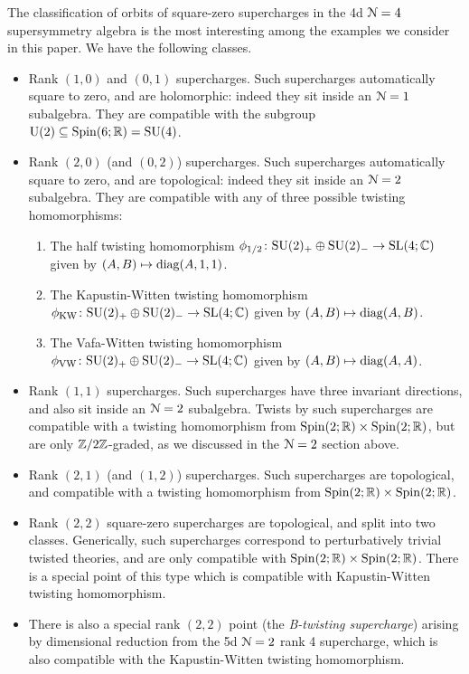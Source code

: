 \documentclass[10pt, oneside]{article}
\renewcommand{\U}{\mathrm{U}}
\begin{document}
The classification of orbits of square-zero supercharges in the 4d $\mathcal{N}=4$ supersymmetry algebra is the most interesting among the examples we consider in this paper.  
We have the following classes. 
\begin{itemize}
\item Rank $(1,0)$ and $(0,1)$ supercharges.  
Such supercharges automatically square to zero, and are holomorphic: indeed they sit inside an $\mathcal{N}=1$ subalgebra.  
They are compatible with the subgroup $\U(2) \sub \Spin(6;\RR) = \SU(4)$.
 \item Rank $(2,0)$ (and $(0,2)$) supercharges.  Such supercharges automatically square to zero, and are topological: indeed they sit inside an $\mathcal{N}=2$ subalgebra.  They are compatible with any of three possible twisting homomorphisms:
 \begin{enumerate}
  \item The half twisting homomorphism $\phi_{\mathrm{1/2}} \colon \mathrm{SU}(2)_+ \oplus \mathrm{SU}(2)_- \to \mathrm{SL}(4;\mathbb C)$ given by $(A,B) \mapsto \mathrm{diag}(A, 1, 1)$.
  \item The Kapustin-Witten twisting homomorphism $\phi_{\mathrm{KW}} \colon \mathrm{SU}(2)_+ \oplus \mathrm{SU}(2)_- \to \mathrm{SL}(4;\mathbb C)$ given by $(A,B) \mapsto \mathrm{diag}(A, B)$.
  \item The Vafa-Witten twisting homomorphism $\phi_{\mathrm{VW}} \colon \mathrm{SU}(2)_+ \oplus \mathrm{SU}(2)_- \to \mathrm{SL}(4;\mathbb C)$ given by $(A,B) \mapsto \mathrm{diag}(A, A)$.
 \end{enumerate}
 \item Rank $(1,1)$ supercharges.  Such supercharges have three invariant directions, and also sit inside an $\mathcal{N}=2$ subalgebra.  Twists by such supercharges are compatible with a twisting homomorphism from $\mathrm{Spin}(2;\mathbb R) \times \mathrm{Spin}(2;\mathbb R)$, but are only $\mathbb Z/2\mathbb Z$-graded, as we discussed in the $\mathcal{N}=2$ section above.
 \item Rank $(2,1)$ (and $(1,2)$) supercharges.  Such supercharges are topological, and compatible with a twisting homomorphism from $\mathrm{Spin}(2;\mathbb R) \times \mathrm{Spin}(2;\mathbb R)$.
 \item Rank $(2,2)$ square-zero supercharges are topological, and split into two classes.  Generically, such supercharges correspond to perturbatively trivial twisted theories, and are only compatible with $\mathrm{Spin}(2;\mathbb R) \times \mathrm{Spin}(2;\mathbb R)$.  There is a special point of this type which is compatible with Kapustin-Witten twisting homomorphism.
 \item There is also a special rank $(2,2)$ point (the \emph{B-twisting supercharge}) arising by dimensional reduction from the 5d $\mathcal{N}=2$ rank 4 supercharge, which is also compatible with the Kapustin-Witten twisting homomorphism.
\end{itemize}
\end{document}
